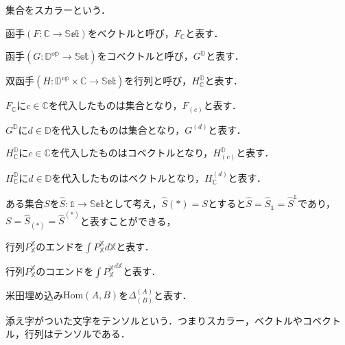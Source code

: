 \documentclass[dvipdfmx]{jsarticle}
\begin{document}
集合をスカラーという．

函手$(F:\mathbb{C}\rightarrow\mathbb{Set})$をベクトルと呼び，$F_\mathbb{C}$と表す．

函手$(G:\mathbb{D^{op}}\rightarrow\mathbb{Set})$をコベクトルと呼び，$G^\mathbb{D}$と表す．

双函手$(H:\mathbb{D^{op}\times\mathbb{C}}\rightarrow\mathbb{Set})$を行列と呼び，$H^\mathbb{D}_\mathbb{C}$と表す．

$F_\mathbb{C}$に$c\in \mathbb{C}$を代入したものは集合となり，$F_{(c)}$と表す．

$G^\mathbb{D}$に$d\in \mathbb{D}$を代入したものは集合となり，$G^{(d)}$と表す．

$H_\mathbb{C}^\mathbb{D}$に$c\in \mathbb{C}$を代入したものはコベクトルとなり，$H_{(c)}^\mathbb{D}$と表す．

$H_\mathbb{C}^\mathbb{D}$に$d\in \mathbb{D}$を代入したものはベクトルとなり，$H_\mathbb{C}^{(d)}$と表す．

ある集合$S$を$\hat{S}:\mathbb{1}\rightarrow\mathbb{Set}$として考え，$\hat{S}(*)=S$とすると$\hat{S}=\hat{S}_\mathbb{1}=\hat{S}^\mathbb{1}$であり，$S=\hat{S}_{(*)}=\hat{S}^{(*)}$と表すことができる，

行列$P_\mathbb{X}^\mathbb{X}$のエンドを$\displaystyle\int P_\mathbb{X}^\mathbb{X} d\mathbb{X}$と表す．

行列$P_\mathbb{X}^\mathbb{X}$のコエンドを$\displaystyle\int {P_\mathbb{X}^\mathbb{X}}^{d\mathbb{X}}$と表す．

米田埋め込み$\text{Hom}(A,B)$を$\Delta^{(A)}_{(B)}$と表す．

添え字がついた文字をテンソルという．つまりスカラー，ベクトルやコベクトル，行列はテンソルである．
\end{document}
